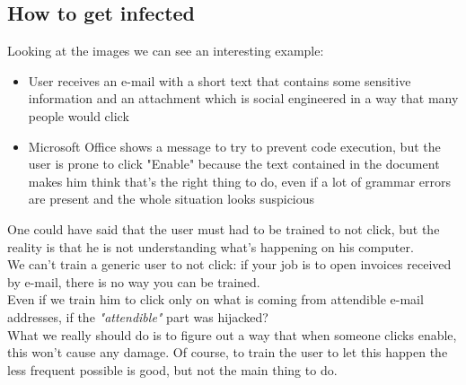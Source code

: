         \subsection{How to get infected}
            \begin{figure}[ht!]
                \centering
            \end{figure}
            Looking at the images we can see an interesting example:
            \begin{itemize}
                \item User receives an e-mail with a short text that contains some sensitive information and an attachment which is social engineered in a way that many people would click
                \item Microsoft Office shows a message to try to prevent code execution, but the user is prone to click "Enable" because the text contained in the document makes him think that's the right thing to do, even if a lot of grammar errors are present and the whole situation looks suspicious
            \end{itemize}
            One could have said that the user must had to be trained to not click, but the reality is that he is not understanding what's happening on his computer.\\
            We can't train a generic user to not click: if your job is to open invoices received by e-mail, there is no way you can be trained.\\
            Even if we train him to click only on what is coming from attendible e-mail addresses, if the \textit{"attendible"} part was hijacked?\\
            What we really should do is to figure out a way that when someone clicks enable, this won't cause any damage. Of course, to train the user to let this happen the less frequent possible is good, but not the main thing to do.